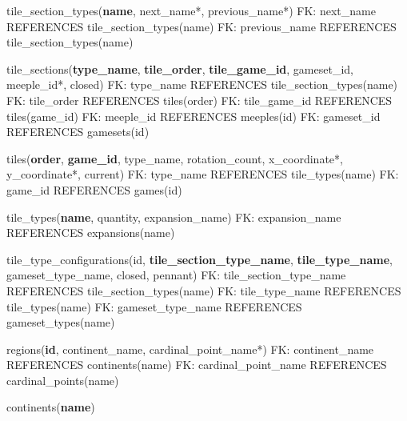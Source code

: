 tile\_section\_types(\textbf{name}, next\_name*, previous\_name*)\newline
FK: next\_name REFERENCES tile\_section\_types(name)\newline
FK: previous\_name REFERENCES tile\_section\_types(name)\newline

tile\_sections(\textbf{type\_name}, \textbf{tile\_order}, \textbf{tile\_game\_id}, gameset\_id, meeple\_id*, closed)\newline
FK: type\_name REFERENCES tile\_section\_types(name)\newline
FK: tile\_order REFERENCES tiles(order)\newline
FK: tile\_game\_id REFERENCES tiles(game\_id)\newline
FK: meeple\_id REFERENCES meeples(id)\newline
FK: gameset\_id REFERENCES gamesets(id)\newline

tiles(\textbf{order}, \textbf{game\_id}, type\_name, rotation\_count, x\_coordinate*, y\_coordinate*, current)\newline
FK: type\_name REFERENCES tile\_types(name)\newline
FK: game\_id REFERENCES games(id)\newline

tile\_types(\textbf{name}, quantity, expansion\_name)\newline
FK: expansion\_name REFERENCES expansions(name)\newline

tile\_type\_configurations(id, \textbf{tile\_section\_type\_name}, \textbf{tile\_type\_name}, gameset\_type\_name, closed, pennant)\newline
FK: tile\_section\_type\_name REFERENCES tile\_section\_types(name)\newline
FK: tile\_type\_name REFERENCES tile\_types(name)\newline
FK: gameset\_type\_name REFERENCES gameset\_types(name)\newline

regions(\textbf{id}, continent\_name, cardinal\_point\_name*)\newline
FK: continent\_name REFERENCES continents(name)\newline
FK: cardinal\_point\_name REFERENCES cardinal\_points(name)\newline

continents(\textbf{name})\newline

